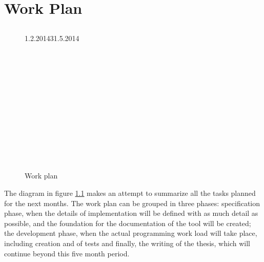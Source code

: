 \chapter{Work Plan}
\label{chap:plan}

\section*{}

\def\pgfcalendarweekdayletter#1{%
\ifcase#1M\or T\or W\or T\or F\or S\or S\fi%
}

\begin{figure}
	\caption{Work plan}
	\label{dia:gantt}
	\begin{ganttchart}[
		x unit=0.005\textwidth,
		time slot format=little-endian
		]{1.2.2014}{31.5.2014}
		 \\
		 \\

		 \\
		 \\
		 \\
		 \\
		 \\

		 \\
		 \\
		 \\
		 \\
		 \\

		 \\
	\end{ganttchart}
\end{figure}

The diagram in figure \ref{dia:gantt} makes an attempt to summarize all the tasks planned for the next months. The work plan can be grouped in three phases: specification phase, when the details of implementation will be defined with as much detail as possible, and the foundation for the documentation of the tool will be created; the development phase, when the actual programming work load will take place, including creation and of tests and finally, the writing of the thesis, which will continue beyond this five month period.

